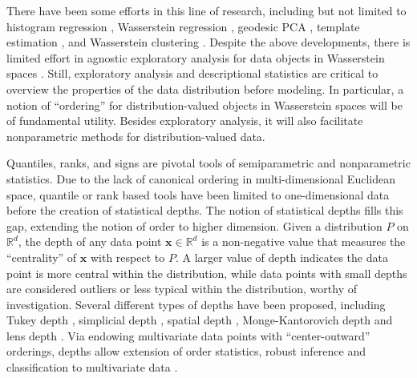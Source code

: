 \documentclass{imsart}
\numberwithin{equation}{section}
\def\R{\mathbb{R}}
\def\x{\mathbf{x}}
\def\x{\mathbf x}
\begin{document}
There have been some efforts in this line of research, including but not limited to histogram regression \citep{bonneel2016wasserstein}, Wasserstein regression \cite{bachoc2023gaussian,chen2023wasserstein, chen2022uniform}, geodesic PCA \citep{AIHP706}, template estimation \citep{boissard2015distribution}, and Wasserstein clustering \citep{zhuang2022wasserstein,del2020optimalflow}.
Despite the above developments, there is limited effort in agnostic exploratory analysis for data objects in Wasserstein spaces \citep{Geenens2023, LopezTukeyMetric, virta2023spatial, dubey2024metric}. Still, exploratory analysis and descriptional statistics are critical to overview the properties of the data distribution before modeling. In particular, a notion of ``ordering'' for distribution-valued objects in Wasserstein spaces will be of fundamental utility.  Besides exploratory analysis, it will also facilitate nonparametric methods for distribution-valued data. 



Quantiles, ranks, and signs are pivotal tools of semiparametric and nonparametric statistics. %
Due to the lack of canonical ordering in multi-dimensional Euclidean space, quantile or rank based tools have been limited to one-dimensional data before the creation of statistical depths. The notion of statistical depths fills this gap, extending the notion of order to higher dimension.
Given a distribution $P$ on $\R^d$, the depth of any data point $\x \in\R^d$ is a non-negative value that measures the ``centrality'' of $\x$ with respect to $P$. 
A larger value of depth indicates the data point is more central within the distribution, while data points with small depths are considered outliers or less typical within the distribution, 
worthy of investigation. Several different types of depths have been proposed, including Tukey depth \citep{tukey1975mathematics,oja1983descriptive}, simplicial depth \citep{liu1990notion}, spatial depth \citep{chaudhuri1996geometric, vardi2000multivariate}, Monge-Kantorovich depth \cite{chernoetal17,HallinEtAl.2020.AoS} and lens depth \citep{Lens}. Via endowing multivariate data points with ``center-outward'' orderings, depths allow extension of order statistics, robust inference \citep{liu1993quality, zuo2006limiting} and classification to multivariate data \citep{zuo2000general, mosler2022choosing}. 
\end{document}
